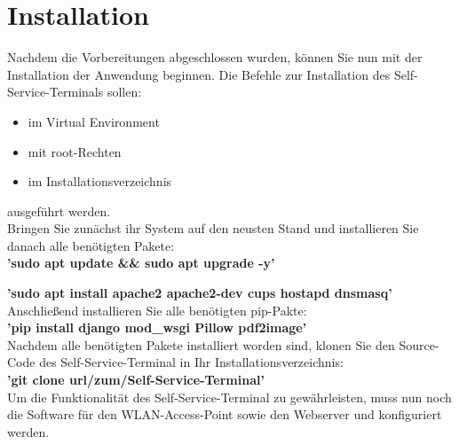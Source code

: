 \section{Installation}
Nachdem die Vorbereitungen abgeschlossen wurden, können Sie nun mit der Installation der Anwendung beginnen. Die Befehle zur Installation des Self-Service-Terminals sollen:

\begin{itemize}
    \item im Virtual Environment
    \item mit root-Rechten
    \item im Installationsverzeichnis
\end{itemize}

\noindent ausgeführt werden.\\

\noindent Bringen Sie zunächst ihr System auf den neusten Stand und installieren Sie danach alle benötigten Pakete:\\

\textbf{’sudo apt update \&\& sudo apt upgrade -y’}\par
\textbf{’sudo apt install apache2 apache2-dev cups hostapd dnsmasq’}\\

\noindent Anschließend installieren Sie alle benötigten pip-Pakte:\\

\textbf{’pip install django mod\_wsgi Pillow pdf2image’}\\

\noindent Nachdem alle benötigten Pakete installiert worden sind, klonen Sie den Source-Code des Self-Service-Terminal in Ihr Installationsverzeichnis:\\

\textbf{’git clone url/zum/Self-Service-Terminal’}\\

\noindent Um die Funktionalität des Self-Service-Terminal zu gewährleisten, muss nun noch die Software für den WLAN-Access-Point sowie den Webserver und konfiguriert werden.
